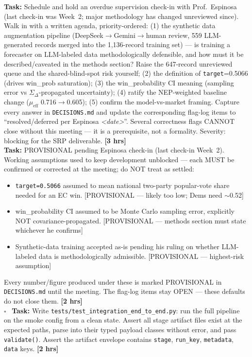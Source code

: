 \documentclass[11pt]{article}
\newcommand{\hrs}[1]{\textbf{[#1 hrs]}}
\newcommand{\task}[2]{%
  \noindent\textbf{Task:} #1 \hfill \hrs{#2}\\}
\newcommand{\done}{\textcolor{sectionblue}{$\square$}\ }
\begin{document}
\begin{taskbox}
\task{Schedule and hold an overdue supervision check-in with Prof.\
  Espinosa (last check-in was Week~2; major methodology has changed
  unreviewed since). Walk in with a written agenda, priority-ordered:
  (1) the synthetic data augmentation pipeline
  (DeepSeek$\to$Gemini$\to$human review, 559 LLM-generated records
  merged into the 1,136-record training set) --- is training a
  forecaster on LLM-labeled data methodologically defensible, and how
  must it be described/caveated in the methods section? Raise the
  647-record unreviewed queue and the shared-blind-spot risk yourself;
  (2) the definition of \texttt{target}=0.5066 (drives win\_prob
  saturation);
  (3) the win\_probability CI meaning (sampling error vs
  $\Sigma_\Delta$-propagated uncertainty);
  (4) ratify the NEP-weighted baseline change
  ($\mu_\text{eff}$ 0.716$\to$0.605);
  (5) confirm the model-vs-market framing.
  Capture every answer in \texttt{DECISIONS.md} and update the
  corresponding flag-log items to ``resolved/deferred per Espinosa
  \textit{<date>}''. Several correctness flags CANNOT close without this
  meeting --- it is a prerequisite, not a formality. Severity: blocking
  for the SRP deliverable.}{3}

\task{PROVISIONAL pending Espinosa check-in (last check-in Week~2).
  Working assumptions used to keep development unblocked --- each MUST be
  confirmed or corrected at the meeting; do NOT treat as settled:
  \begin{itemize}[leftmargin=1.6em, itemsep=1pt]
    \item \texttt{target=0.5066} assumed to mean national two-party
      popular-vote share needed for an EC win. [PROVISIONAL --- likely too
      low; Dems need $\sim$0.52]
    \item win\_probability CI assumed to be Monte Carlo sampling error,
      explicitly NOT covariance-propagated. [PROVISIONAL --- methods
      section must state whichever he confirms]
    \item Synthetic-data training accepted as-is pending his ruling on
      whether LLM-labeled data is methodologically admissible.
      [PROVISIONAL --- highest-risk assumption]
  \end{itemize}
  Every number/figure produced under these is marked PROVISIONAL in
  \texttt{DECISIONS.md} until the meeting. The flag-log items stay OPEN
  --- these defaults do not close them.}{2}

\done \task{Write \texttt{tests/test\_integration\_end\_to\_end.py}: run the
  full pipeline on the smoke config from a clean state. Assert all stage
  artifact files exist at the expected paths, parse into their typed payload
  classes without error, and pass \texttt{validate()}. Assert the artifact
  envelope contains \texttt{stage}, \texttt{run\_key}, \texttt{metadata},
  \texttt{data} keys.}{2}


\end{taskbox}
\end{document}
